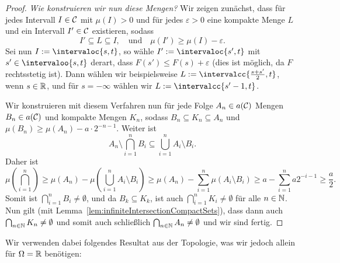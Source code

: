\documentclass[language=ngerman]{../../Template/TemplateLecture}
\begin{document}
\begin{proof}
    \emph{Wie konstruieren wir nun diese Mengen?} Wir zeigen zunächst, dass für jedes Intervall $I \in \mathcal{C}$ mit $\mu(I) > 0$ und für jedes $\varepsilon > 0$ eine kompakte Menge $L$ und ein Intervall $I' \in \mathcal{C}$ existieren, sodass 
    \begin{equation}
        I' \subseteq L \subseteq I, \quad \text{und} \quad \mu(I') \geq \mu(I) - \varepsilon.
    \end{equation}
    Sei nun $I := \intervaloc{s,t}$, so wähle $I' := \intervaloc{s',t}$ mit $s' \in \intervaloo{s,t}$ derart, dass $F(s') \leq F(s) + \varepsilon$ (dies ist möglich, da $F$ rechtsstetig ist). Dann wählen wir beispielsweise $L :=\intervalcc{\frac{s+s'}{2},t}$, wenn $s \in \mathbb{R}$, und für $s = -\infty$ wählen wir $L := \intervalcc{s' - 1, t}$.
    
    Wir konstruieren mit diesem Verfahren nun für jede Folge $A_n \in a(\mathcal{C})$ Mengen $B_n \in a(\mathcal{C})$ und kompakte Mengen $K_n$, sodass $B_n \subseteq K_n \subseteq A_n$ und $\mu(B_n) \geq \mu(A_n) - a \cdot 2^{-n-1}$. Weiter ist
    \begin{equation}
        A_n \setminus \bigcap_{i = 1}^n B_i \subseteq \bigcup_{i = 1}^n A_i \setminus B_i.
    \end{equation}
    Daher ist 
    \begin{equation}
        \mu\left(\bigcap_{i = 1}^n\right) \geq \mu(A_n) - \mu\left(\bigcup_{i = 1}^n A_i \setminus B_i\right) \geq \mu(A_n) - \sum_{i = 1}^n \mu(A_i \setminus B_i) \geq a - \sum_{i =1}^n a2^{-i-1} \geq \frac{a}{2}.
    \end{equation}
    Somit ist $\bigcap_{i = 1}^n B_i \neq \emptyset$, und da $B_k \subseteq K_k$, ist auch $\bigcap_{i = 1}^n K_i \neq \emptyset$ für alle $n \in \mathbb{N}$. Nun gilt (mit Lemma~\ref{lem:infiniteIntersectionCompactSets}), dass dann auch $\bigcap_{n \in \mathbb{N}} K_n \neq \emptyset$ und somit auch schließlich $\bigcap_{n \in \mathbb{N}} A_n \neq \emptyset$ und wir sind fertig. 
\end{proof}

\begin{bemerkung}
    Wir verwenden dabei folgendes Resultat aus der Topologie, was wir jedoch allein für $\Omega = \mathbb{R}$ benötigen:
\end{bemerkung}
\end{document}
